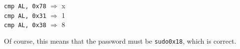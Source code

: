\documentclass{report}
\begin{document}
\begin{sloppypar}
\begin{center}
    \texttt{cmp AL, 0x78} $\Rightarrow$ x\\
    \texttt{cmp AL, 0x31} $\Rightarrow$ 1\\
    \texttt{cmp AL, 0x38} $\Rightarrow$ 8 \\
  \end{center}
  Of course, this means that the password must be \texttt{sudo0x18}, which
  is correct.



















\end{sloppypar}
\end{document}
